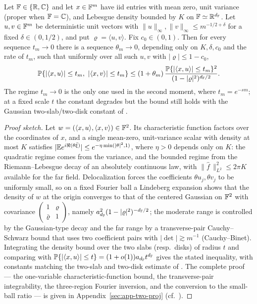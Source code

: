\begin{lemma}\label{lem:two-proj}
Let $\mathbb{F}\in\{\mathbb{R},\mathbb{C}\}$ and let $x\in\mathbb{F}^m$ have iid entries with mean zero, unit
variance (proper when $\mathbb{F}=\mathbb{C}$), and Lebesgue density bounded by $K$ on
$\mathbb{F}\simeq\mathbb{R}^{d_{\mathbb{F}}}$.  Let $u,v\in\mathbb{F}^m$ be deterministic unit vectors with
$\|u\|_\infty,\|v\|_\infty\le m^{-1/2+\delta}$ for a fixed $\delta\in(0,1/2)$, and
put $\varrho=\langle u,v\rangle$.  Fix \(c_0\in(0,1)\).  Then for every sequence
$t_m\to0$ there is a sequence $\theta_m\to0$, depending only on \(K,\delta,c_0\)
and the rate of $t_m$, such that uniformly over all such $u,v$ with
$|\varrho|\le1-c_0$,
\[
  \mathbb{P}\{|\langle x,u\rangle|\le t_m,\ |\langle x,v\rangle|\le t_m\}
  \le (1+\theta_m)\,
      \frac{\mathbb{P}\{|\langle x,u\rangle|\le t_m\}^2}{(1-|\varrho|^2)^{d_{\mathbb{F}}/2}} .
\]
The regime $t_m\to0$ is the only one used in the second moment, where
$t_m=e^{-sm}$; at a fixed scale $t$ the constant degrades but the bound still holds
with the Gaussian two-slab/two-disk constant of \cite{ShmaloExtremal2026}.
\end{lemma}

\begin{proof}[Proof sketch]
Let $w=(\langle x,u\rangle,\langle x,v\rangle)\in\mathbb{F}^2$.  Its characteristic
function factors over the coordinates of $x$, and a single mean-zero,
unit-variance scalar with density at most $K$ satisfies
$|\mathbb{E} e^{i\Re(\theta\bar\xi)}|\le e^{-\eta\min(|\theta|^2,1)}$, where $\eta>0$
depends only on $K$: the quadratic regime comes from the variance, and the bounded
regime from the Riemann--Lebesgue decay of an absolutely continuous law, with
$\|\widehat{f}\,\|_{L^2}^2\le 2\pi K$ available for the far field.  Delocalization
forces the coefficients $\theta u_j,\theta v_j$ to be uniformly small, so on a
fixed Fourier ball a Lindeberg expansion shows that the density of $w$ at the
origin converges to that of the centered Gaussian on $\mathbb{F}^2$ with covariance
$\left(\begin{smallmatrix}1&\varrho\\ \bar\varrho&1\end{smallmatrix}\right)$, namely
$a_{d_{\mathbb{F}}}^2(1-|\varrho|^2)^{-d_{\mathbb{F}}/2}$; the moderate range is controlled by the
Gaussian-type decay and the far range by a transverse-pair Cauchy--Schwarz bound
that uses two coefficient pairs with $|\det|\gtrsim m^{-1}$ (Cauchy--Binet).
Integrating the density bound over the two slabs (resp.\ disks) of radius $t$ and
comparing with $\mathbb{P}\{|\langle x,u\rangle|\le t\}=(1+o(1))a_{d_{\mathbb{F}}}t^{d_{\mathbb{F}}}$ gives the
stated inequality, with constants matching the two-slab and two-disk estimate of
\cite{ShmaloExtremal2026}.  The complete proof --- the one-variable
characteristic-function bound, the transverse-pair integrability, the three-region
Fourier inversion, and the conversion to the small-ball ratio --- is given in
Appendix~\ref{sec:app-two-proj} (cf.\ \cite{Petrov1975}).
\end{proof}

